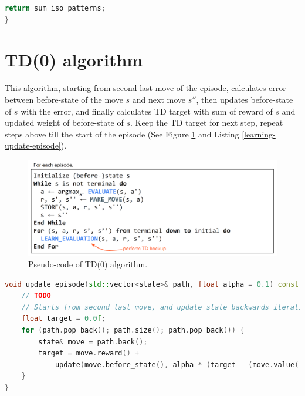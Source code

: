 \begin{enumerate}
\begin{lstlisting}[language=C++, caption={C++ code of \textcolor{blue}{update} function of class \textcolor{blue}{pattern}.}, label={pattern-update}]
	return sum_iso_patterns;
}\end{lstlisting}
\end{enumerate}

\pagebreak
\section{TD(0) algorithm}
\indent
	This algorithm, starting from second last move of the episode, 
	calculates error between before-state of the move $s$ and next move $s''$, then 
	updates before-state of $s$ with the error, and finally 
	calculates TD target with sum of reward of $s$ and updated weight of before-state of $s$. 
	Keep the TD target for next step, repeat steps above till the start of the episode 
	(See Figure \ref{td-0-algorithm} and Listing \ref{learning-update-episode}). 
\begin{figure}[H]
	\centering
	\includegraphics[scale=0.5]{img/td.png}
	\caption{Pseudo-code of TD(0) algorithm.}
	\label{td-0-algorithm}
\end{figure}
\begin{lstlisting}[language=C++, caption={C++ code of \textcolor{blue}{update\_episode} function of class \textcolor{blue}{learning}.}, label={learning-update-episode}]
void update_episode(std::vector<state>& path, float alpha = 0.1) const {
	// TODO
	// Starts from second last move, and update state backwards iteratively.
	float target = 0.0f;
	for (path.pop_back(); path.size(); path.pop_back()) {
		state& move = path.back();
		target = move.reward() + 
			update(move.before_state(), alpha * (target - (move.value() - move.reward())));
	}
}\end{lstlisting}

\pagebreak
